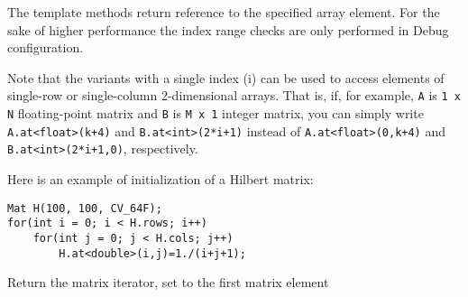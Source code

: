 \begin{description}
\end{description}

The template methods return reference to the specified array element. For the sake of higher performance the index range checks are only performed in Debug configuration.

Note that the variants with a single index (i) can be used to access elements of single-row or single-column 2-dimensional arrays. That is, if, for example, \texttt{A} is \texttt{1 x N} floating-point matrix and \texttt{B} is \texttt{M x 1} integer matrix, you can simply write \texttt{A.at<float>(k+4)} and \texttt{B.at<int>(2*i+1)} instead of \texttt{A.at<float>(0,k+4)} and \texttt{B.at<int>(2*i+1,0)}, respectively.

Here is an example of initialization of a Hilbert matrix:

\begin{lstlisting}
Mat H(100, 100, CV_64F);
for(int i = 0; i < H.rows; i++)
    for(int j = 0; j < H.cols; j++)
        H.at<double>(i,j)=1./(i+j+1);
\end{lstlisting}

Return the matrix iterator, set to the first matrix element

